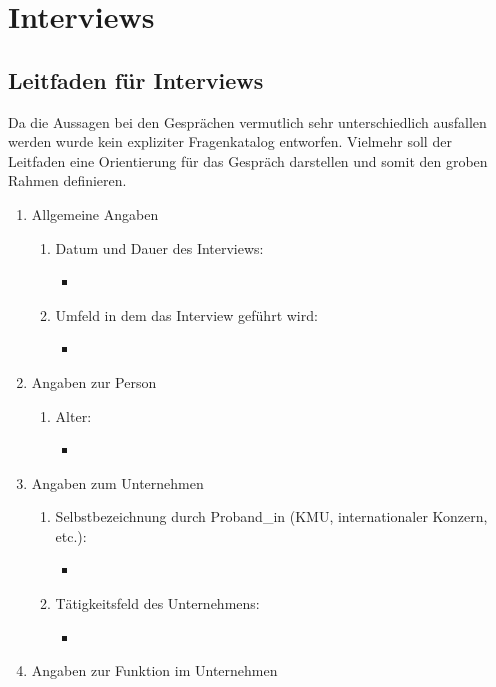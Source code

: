 \documentclass[Bachelorarbeit.tex]{subfiles}
\begin{document}
\chapter{Interviews}

\newpage
\section{Leitfaden für Interviews}
Da die Aussagen bei den Gesprächen vermutlich sehr unterschiedlich ausfallen werden wurde kein expliziter Fragenkatalog entworfen. Vielmehr soll der Leitfaden eine Orientierung für das Gespräch darstellen und somit den groben Rahmen definieren.

\begin{enumerate}
	\item Allgemeine Angaben
	\begin{enumerate}
		\item Datum und Dauer des Interviews:
		\begin{itemize}
			\item[] 
		\end{itemize}
		\item Umfeld in dem das Interview geführt wird:
		\begin{itemize}
			\item[]
		\end{itemize}
	\end{enumerate}
	\item Angaben zur Person
	\begin{enumerate}
		\item Alter:
		\begin{itemize}
			\item[] 
		\end{itemize}
	\end{enumerate}
	\item Angaben zum Unternehmen
	\begin{enumerate}
		\item Selbstbezeichnung durch Proband\_in  (\ac{KMU}, internationaler Konzern, etc.):
		\begin{itemize}
			\item[] 
		\end{itemize}
		\item Tätigkeitsfeld des Unternehmens:
		\begin{itemize}
			\item[] 
		\end{itemize}
	\end{enumerate}
	\item Angaben zur Funktion im Unternehmen

\end{enumerate}
\end{document}
